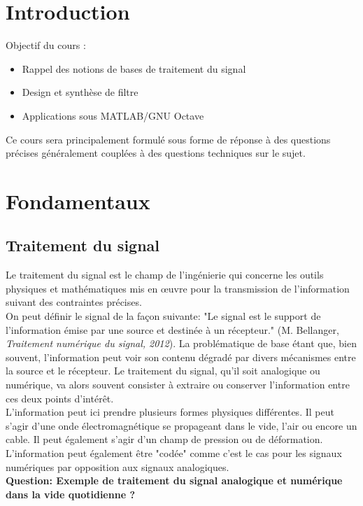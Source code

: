 \documentclass[11pt,a4paper]{article}
\begin{document}
\tableofcontents

\section*{Introduction}
Objectif du cours : 
\begin{itemize}
\item Rappel des notions de bases de traitement du signal 
\item Design et synthèse de filtre 
\item Applications sous MATLAB/GNU Octave
\end{itemize}

Ce cours sera principalement formulé sous forme de réponse à des questions précises généralement couplées à des questions techniques sur le sujet.

\section{Fondamentaux}
\subsection{Traitement du signal}
Le traitement du signal est le champ de l'ingénierie qui concerne les outils physiques et mathématiques mis en œuvre pour la transmission de l'information suivant des contraintes précises.\\

On peut définir le signal de la façon suivante: "Le signal est le support de l’information émise par une source et destinée à un récepteur." (M. Bellanger, \textit{Traitement numérique du signal, 2012}). La problématique de base étant que, bien souvent, l'information peut voir son contenu dégradé par divers mécanismes entre la source et le récepteur. Le traitement du signal, qu'il soit analogique ou numérique, va alors souvent consister à extraire ou conserver l'information entre ces deux points d'intérêt.\\

L'information peut ici prendre plusieurs formes physiques différentes. Il peut s'agir d'une onde électromagnétique se propageant dans le vide, l'air ou encore un cable. Il peut également s'agir d'un champ de pression ou de déformation. L'information peut également être "codée" comme c'est le cas pour les signaux numériques par opposition aux signaux analogiques.\\

\textbf{Question: Exemple de traitement du signal analogique et numérique dans la vide quotidienne ?}\\
\end{document}
